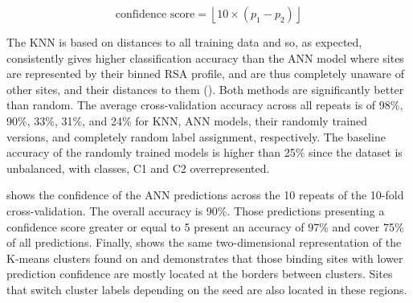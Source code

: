 \begin{equation}
\text{confidence score} = \left\lfloor 10 \times (p_1 - p_2) \right\rfloor
\label{eq:confidence_score}
\end{equation}

\vspace{-20pt} %

The KNN is based on distances to all training data and so, as expected, consistently gives higher classification accuracy than the ANN model where sites are represented by their binned RSA profile, and are thus completely unaware of other sites, and their distances to them (). Both methods are significantly better than random. The average cross-validation accuracy across all repeats is of 98\%, 90\%, 33\%, 31\%, and 24\% for KNN, ANN models, their randomly trained versions, and completely random label assignment, respectively. The baseline accuracy of the randomly trained models is higher than 25\% since the dataset is unbalanced, with classes, C1 and C2 overrepresented.

 shows the confidence of the ANN predictions across the 10 repeats of the 10-fold cross-validation. The overall accuracy is 90\%. Those predictions presenting a confidence score greater or equal to 5 present an accuracy of 97\% and cover 75\% of all predictions. Finally,  shows the same two-dimensional representation of the K-means clusters found on  and demonstrates that those binding sites with lower prediction confidence are mostly located at the borders between clusters. Sites that switch cluster labels depending on the seed are also located in these regions.

